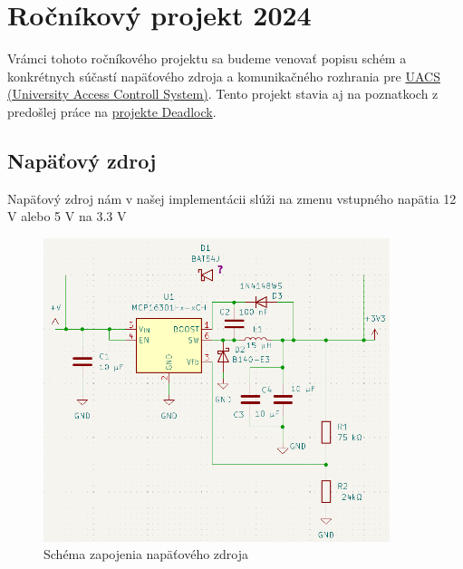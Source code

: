 
\section*{Ročníkový projekt 2024}

Vrámci tohoto ročníkového projektu sa budeme venovať popisu schém a konkrétnych súčastí napäťového zdroja a komunikačného rozhrania pre \href{https://github.com/ostertag/UACS}{UACS (University Access Controll System)}. Tento projekt stavia aj na poznatkoch z predošlej práce na \href{https://gitlab.com/project-deadlock}{projekte Deadlock}.

\subsection*{Napäťový zdroj}

Napäťový zdroj nám v našej implementácii slúži na zmenu vstupného napätia 12 V alebo 5 V na 3.3 V

\begin{figure}[h!]
    \centerline{\includegraphics[width=0.9\textwidth]{schematic_power_suplly.png}}
    \caption{Schéma zapojenia napäťového zdroja}
    \label{obr:shc1}
\end{figure}


